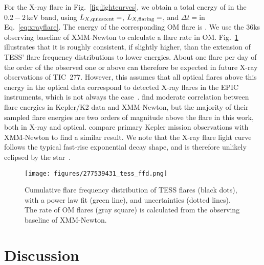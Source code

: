 \documentclass[twocolumn]{aastex631}
\begin{document}
For the X-ray flare in Fig.~\ref{fig:lightcurves}, we obtain a total energy of \eepic in the $0.2-2\,$keV band, using $L_{X,\rm quiescent}=$\LXquiet\unskip, $L_{X,\rm flaring}=$\LXflaring\unskip, and $\Delta t =$\xraydur\unskip in Eq.~\ref{eq:xrayflare}. The energy of the corresponding OM flare is \eom\unskip. We use the 36ks observing baseline of XMM-Newton to calculate a flare rate in OM. Fig.~\ref{fig:ffd} illustrates that it is roughly consistent, if slightly higher, than the extension of TESS' flare frequency distributions to lower energies. About one flare per day of the order of the observed one or above can therefore be expected in future X-ray observations of TIC~277. However, this assumes that all optical flares above this energy in the optical data correspond to detected X-ray flares in the EPIC instruments, which is not always the case~\citep{paudel2021simultaneous}. \citet{guarcello2019simultaneous, kuznetsov2021stellar} find moderate correlation between flare energies in Kepler/K2 data and XMM-Newton, but the majority of their sampled flare energies are two orders of magnitude above the flare in this work, both in X-ray and optical. \citet{kuznetsov2021stellar} compare primary Kepler mission observations with XMM-Newton to find a similar result. We note that the X-ray flare light curve follows the typical fast-rise exponential decay shape, and is therefore unlikely eclipsed by the star~\citep{johnstone2012soft}.


\begin{figure}
    \begin{centering}
        \texttt{[image: figures/277539431\_tess\_ffd.png]}
        \caption{
         Cumulative flare frequency distribution of TESS flares (black dots), with a power law fit (green line), and uncertainties (dotted lines). The rate of OM flares (gray square) is calculated from the observing baseline of XMM-Newton. 
        }
        \label{fig:ffd}
    \end{centering}
\end{figure}

\section{Discussion}
\label{sec:discussion}
\end{document}
